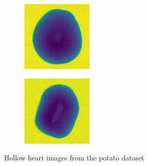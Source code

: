\documentclass[11pt]{article}
\begin{document}
\begin{figure}[!h]
\begin{subfigure}[b]{0.22\textwidth}
         \caption{}
         \label{fig:hollow_33}
     \end{subfigure}
     \hfill
     \begin{subfigure}[b]{0.22\textwidth}
         \centering
         \includegraphics[width=\textwidth]{figurer/potato_dataset/hollow/hollow_34.jpg}
         \caption{}
         \label{fig:hollow_34}
     \end{subfigure}
     \hfill
     \begin{subfigure}[b]{0.22\textwidth}
         \centering
         \includegraphics[width=\textwidth]{figurer/potato_dataset/hollow/hollow_35.jpg}
         \caption{}
         \label{fig:hollow_35}
     \end{subfigure}
    \caption{Hollow heart images from the potato dataset}
\end{figure}
\end{document}
